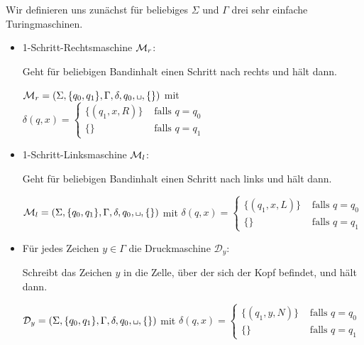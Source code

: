 \begin{Bsp}\label{bsp:simpletms} Wir definieren uns zunächst für beliebiges $\Sigma$ und $\Gamma$ drei sehr einfache Turingmaschinen. 
 \begin{itemize}
  \item 1-Schritt-Rechtsmaschine $\mathcal{M}_r$:
  
  Geht für beliebigen Bandinhalt einen Schritt nach rechts und hält dann.
  
  $\M_r=\left(\Sigma,\{q_0,q_1\},\Gamma,\delta,q_0,\blank,\{\}\right)$ mit
  $\delta(q,x)=\begin{cases}\{(q_1, x, R)\} & \text{ falls } q = q_0\\ \{\} & \text{ falls } q = q_1\end{cases}$
  
  \item 1-Schritt-Linksmaschine $\mathcal{M}_l$:
  
  Geht für beliebigen Bandinhalt einen Schritt nach links und hält dann.

  $\M_l=\left(\Sigma,\{q_0,q_1\},\Gamma,\delta,q_0,\blank,\{\}\right)$ mit
  $\delta(q,x)=\begin{cases}\{(q_1, x, L)\} & \text{ falls } q = q_0\\ \{\} & \text{ falls } q = q_1\end{cases}$
  
  \item Für jedes Zeichen $y\in\Gamma$ die Druckmaschine $\mathcal{D}_y$:
  
  Schreibt das Zeichen $y$ in die Zelle, über der sich der Kopf befindet, und hält dann.

  $\mathcal{D}_y=\left(\Sigma,\{q_0,q_1\},\Gamma,\delta,q_0,\blank,\{\}\right)$ mit
  $\delta(q,x)=\begin{cases}\{(q_1, y, N)\} & \text{ falls } q = q_0\\ \{\} & \text{ falls } q = q_1\end{cases}$

 \end{itemize}
\end{Bsp}


